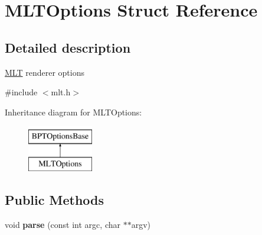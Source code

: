 \hypertarget{struct_m_l_t_options}{}\section{M\+L\+T\+Options Struct Reference}
\label{struct_m_l_t_options}


\subsection{Detailed description}
\hyperlink{struct_m_l_t}{M\+LT} renderer options 

{\ttfamily \#include $<$mlt.\+h$>$}

Inheritance diagram for M\+L\+T\+Options\+:\begin{figure}[H]
\begin{center}
\leavevmode
\includegraphics[height=2.000000cm]{struct_m_l_t_options}
\end{center}
\end{figure}
\subsection*{Public Methods}
\begin{DoxyCompactItemize}
\item 
\mbox{\label{struct_m_l_t_options_aa5542e6d9626622b398b5f399b4ba642}} 
void {\bfseries parse} (const int argc, char $\ast$$\ast$argv)
\end{DoxyCompactItemize}
